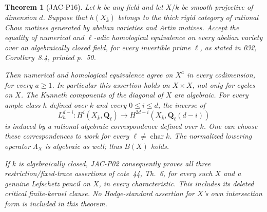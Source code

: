 \documentclass[11pt,a4paper]{article}
\newtheorem{theorem}{Theorem}[section]
\begin{document}
\begin{theorem}[JAC-P16]\label{jac:P16}
Let $k$ be any field and let $X/k$ be smooth projective of dimension
$d$. Suppose that $h(X_{\bar k})$ belongs to the thick rigid
category of rational Chow motives generated by abelian varieties
and Artin motives. Accept the equality of numerical and
$\ell$-adic homological equivalence on every abelian variety over
an algebraically closed field, for every invertible prime $\ell$,
as stated in 032, Corollary~8.4, printed p.~50.

Then numerical and homological equivalence agree on $X^a$ in
every codimension, for every $a\ge1$. In particular this assertion
holds on $X\times X$, not only for cycles on $X$.
The Kunneth components of the diagonal of $X$ are algebraic.
For every ample class $h$ defined over $k$ and every $0\le i\le d$,
the inverse of
\[
 L_h^{d-i}:H^i(X_{\bar k},\mathbf Q_\ell)
       \longrightarrow
 H^{2d-i}(X_{\bar k},\mathbf Q_\ell(d-i))                 \tag{JAC.P16.1}
\]
is induced by a rational algebraic correspondence defined over $k$.
One can choose these correspondences to work for every
$\ell\ne\operatorname{char}k$. The normalized lowering operator
$\Lambda_X$ is algebraic as well; thus $B(X)$ holds.

If $k$ is algebraically closed, JAC-P02 consequently proves all
three restriction/fixed-trace assertions of cote~44, Th.~6, for
every such $X$ and a genuine Lefschetz pencil on $X$, in every
characteristic. This includes its deleted critical finite-kernel
clause. No Hodge-standard assertion for $X$'s own intersection
form is included in this theorem.
\end{theorem}
\end{document}
